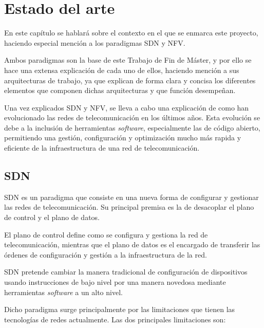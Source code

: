 \chapter{Estado del arte}
En este capítulo se hablará sobre el contexto en el que se enmarca este proyecto, haciendo especial mención a los paradigmas \ac{SDN} y \ac{NFV}.

Ambos paradigmas son la base de este Trabajo de Fin de Máster, y por ello se hace una extensa explicación de cada uno de ellos, haciendo mención a sus arquitecturas de trabajo, ya que explican de forma clara y concisa los diferentes elementos que componen dichas arquitecturas y que función desempeñan.

Una vez explicados \ac{SDN} y \ac{NFV}, se lleva a cabo una explicación de como han evolucionado las redes de telecomunicación en los últimos años. Esta evolución se debe a la inclusión de herramientas \textit{software}, especialmente las de código abierto, permitiendo una gestión, configuración y optimización mucho más rapida y eficiente de la infraestructura de una red de telecomunicación.

\section{SDN}
\label{sec:sdn}

\ac{SDN}\cite{sdnbib} es un paradigma que consiste en una nueva forma de configurar y gestionar las redes de telecomunicación. Su principal premisa es la de desacoplar el plano de control y el plano de datos.

El plano de control define como se configura y gestiona la red de telecomunicación, mientras que el plano de datos es el encargado de transferir las órdenes de configuración y gestión a la infraestructura de la red.

\ac{SDN} pretende cambiar la manera tradicional de configuración de dispositivos usando instrucciones de bajo nivel por una manera novedosa mediante herramientas \textit{software} a un alto nivel.

Dicho paradigma surge principalmente por las limitaciones que tienen las tecnologías de redes actualmente. Las dos principales limitaciones son:


